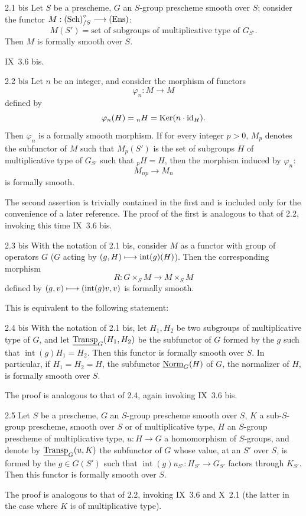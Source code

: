 \begin{proposition}{2.1 bis}\label{XI.2.1bis}
Let $S$ be a prescheme, $G$ an $S$-group prescheme smooth over $S$; consider the functor $M:\textup{(Sch)}^\circ_{/S}\longrightarrow\textup{(Ens)}$:
\[
M(S')=\text{set of subgroups of multiplicative type of }G_{S'}.
\]
Then $M$ is formally smooth over $S$.
\end{proposition}
\Cf IX~3.6 bis.
\begin{corollary}{2.2 bis}\label{XI.2.2bis}
Let $n$ be an integer, and consider the morphism of functors
\[
\varphi_n:M\to M
\]
defined by
\[
\varphi_n(H)={}_nH=\operatorname{Ker}(n\cdot\mathrm{id}_H).
\]
Then $\varphi_n$ is a formally smooth morphism. If for every integer $p>0$, $M_p$ denotes the subfunctor of $M$ such that $M_p(S')$ is the set of subgroups $H$ of multiplicative type of $G_{S'}$ such that ${}_pH=H$, then the morphism induced by $\varphi_n$:
\[
M_{np}\to M_n
\]
is formally smooth.
\end{corollary}
The second assertion is trivially contained in the first and is included only for the convenience of a later reference. The proof of the first is analogous to that of 2.2, invoking this time IX~3.6 bis.
\begin{corollary}{2.3 bis}\label{XI.2.3bis}
With the notation of 2.1 bis, consider $M$ as a functor with group of operators $G$ ($G$ acting by $(g,H)\longmapsto\operatorname{int}(g)(H)$). Then the corresponding morphism
\[
R:G\times_S M\to M\times_S M
\]
defined by $(g,v)\longmapsto(\operatorname{int}(g)v,v)$ is formally smooth.
\end{corollary}
This is equivalent to the following statement:
\begin{corollary}{2.4 bis}\label{XI.2.4bis}
With the notation of 2.1 bis, let $H_1,H_2$ be two subgroups of multiplicative type of $G$, and let $\underline{\operatorname{Transp}}_G(H_1,H_2)$ be the subfunctor of $G$ formed by the $g$ such that $\operatorname{int}(g)H_1=H_2$. Then this functor is formally smooth over $S$. In particular, if $H_1=H_2=H$, the subfunctor $\underline{\mathrm{Norm}}_G(H)$ of $G$, the normalizer of $H$, is formally smooth over $S$.
\end{corollary}
The proof is analogous to that of 2.4, again invoking IX~3.6 bis.
\begin{proposition}{2.5}\label{XI.2.5}
Let $S$ be a prescheme, $G$ an $S$-group prescheme smooth over $S$, $K$ a sub-$S$-group prescheme, smooth over $S$ or of multiplicative type, $H$ an $S$-group prescheme of multiplicative type, $u:H\to G$ a homomorphism of $S$-groups, and denote by $\underline{\operatorname{Transp}}_G(u,K)$ the subfunctor of $G$ whose value, at an $S'$ over $S$, is formed by the $g\in G(S')$ such that $\operatorname{int}(g)u_{S'}:H_{S'}\to G_{S'}$ factors through $K_{S'}$. Then this functor is formally smooth over $S$.
\end{proposition}
The proof is analogous to that of 2.2, invoking IX~3.6 and X~2.1 (the latter in the case where $K$ is of multiplicative type).

